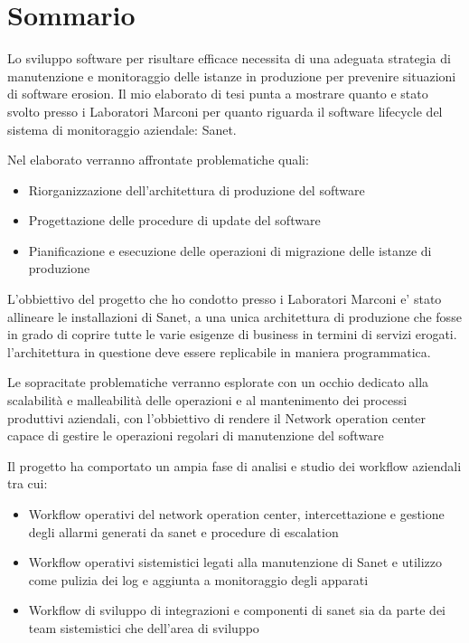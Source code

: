\documentclass[12pt,a4paper,twoside,openright]{book}
\begin{document}
\frontmatter

\maketitle

\chapter*{Sommario}

Lo sviluppo software per risultare efficace necessita di una adeguata strategia di manutenzione e monitoraggio delle istanze in produzione per prevenire situazioni di software erosion. Il mio elaborato di tesi punta a mostrare quanto e stato svolto presso i Laboratori Marconi per quanto riguarda il software lifecycle del sistema di monitoraggio aziendale: Sanet.

Nel elaborato verranno affrontate problematiche quali:

\begin{itemize}
  \item Riorganizzazione dell'architettura di produzione del software
  \item Progettazione delle procedure di update del software
  \item Pianificazione e esecuzione delle operazioni di migrazione delle istanze di produzione
\end{itemize}

L'obbiettivo del progetto che ho condotto presso i Laboratori Marconi e' stato allineare le installazioni di Sanet, a una unica architettura di produzione che fosse in grado di coprire tutte le varie esigenze di business in termini di servizi erogati. l'architettura in questione deve essere replicabile in maniera programmatica.

Le sopracitate problematiche verranno esplorate con un occhio dedicato alla scalabilità e malleabilità delle operazioni e al mantenimento dei processi produttivi aziendali, con l'obbiettivo di rendere il Network operation center capace di gestire le operazioni regolari di manutenzione del software

Il progetto ha comportato un ampia fase di analisi e studio dei workflow aziendali tra cui:

\begin{itemize}
  \item Workflow operativi del network operation center, intercettazione e gestione degli allarmi generati da sanet e procedure di escalation
  \item Workflow operativi sistemistici legati alla manutenzione di Sanet e utilizzo come pulizia dei log e aggiunta a monitoraggio degli apparati
  \item Workflow di sviluppo di integrazioni e componenti di sanet sia da parte dei team sistemistici che dell'area di sviluppo
\end{itemize}
\end{document}
